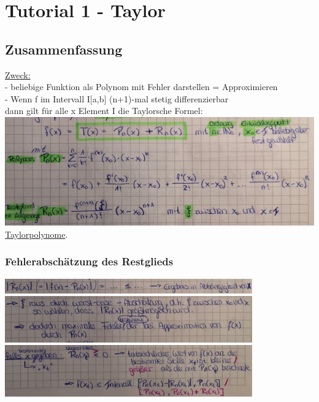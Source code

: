 \documentclass[12pt,a4paper]{article}
\begin{document}
\section{Tutorial 1 - Taylor}
\subsection{Zusammenfassung}
\underline{Zweck:}\\
- beliebige Funktion als Polynom mit Fehler darstellen = Approximieren\\
- Wenn f im Intervall I[a,b] (n+1)-mal stetig differenzierbar\\
dann gilt für alle x Element I die Taylorsche Formel:\\
\includegraphics[width=1\textwidth]{Bilder/1.png}\\
\href{http://www.mathematik.net/reihen-taylor-polynome/tp2s41.htm}{Taylorpolynome}.
\subsubsection{Fehlerabschätzung des Restglieds}
\includegraphics[width=0.8\textwidth]{Bilder/2.png}\\
\includegraphics[width=0.8\textwidth]{Bilder/3.png}\\
\includegraphics[width=0.8\textwidth]{Bilder/4.png}\\
\end{document}
